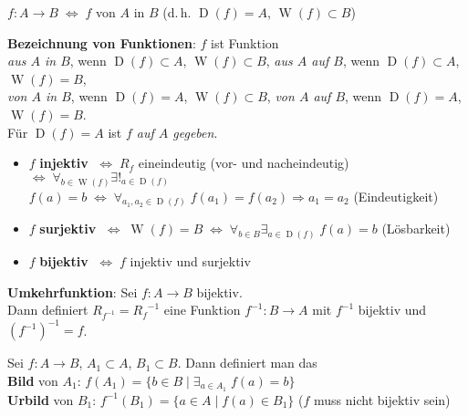 $f: A \rightarrow B \;\Leftrightarrow\; f$ von $A$ in $B$
(d.\,h. $\operatorname{D}(f) = A$, $\operatorname{W}(f) \subset B$)

\textbf{Bezeichnung von Funktionen}: $f$ ist Funktion \\
\emph{aus $A$ in $B$}, wenn
$\operatorname{D}(f) \subset A$, $\operatorname{W}(f) \subset B$, \qquad
\emph{aus $A$ auf $B$}, wenn
$\operatorname{D}(f) \subset A$, $\operatorname{W}(f) = B$, \\
\emph{von $A$ in $B$}, wenn
$\operatorname{D}(f) = A$, $\operatorname{W}(f) \subset B$, \qquad
\emph{von $A$ auf $B$}, wenn
$\operatorname{D}(f) = A$, $\operatorname{W}(f) = B$. \\
Für $\operatorname{D}(f) = A$ ist \emph{$f$ auf $A$ gegeben}.

\linie

\begin{itemize}
    \item $f$ \textbf{injektiv}
    $\;\Leftrightarrow\; R_f$ eineindeutig (vor- und nacheindeutig) \\
    $\Leftrightarrow\; \forall_{b \in \operatorname{W}(f)}
    \exists!_{a \in \operatorname{D}(f)} $
    $f(a) = b \;\Leftrightarrow\; \forall_{a_1, a_2 \in \operatorname{D}(f)}\;
    f(a_1) = f(a_2) \Rightarrow a_1 = a_2$ (Eindeutigkeit)
    
    \item $f$ \textbf{surjektiv}
    $\;\Leftrightarrow\; \operatorname{W}(f) = B \;\Leftrightarrow\;
    \forall_{b \in B} \exists_{a \in \operatorname{D}(f)}\; f(a) = b$
    (Lösbarkeit)
    
    \item $f$ \textbf{bijektiv} $\;\Leftrightarrow\; f$ injektiv und surjektiv
\end{itemize}

\textbf{Umkehrfunktion}: Sei $f: A \rightarrow B$ bijektiv. \\
Dann definiert
$R_{f^{-1}} = {R_f}^{-1}$ eine Funktion $f^{-1}: B \rightarrow A$ mit
$f^{-1}$ bijektiv und $(f^{-1})^{-1} = f$.

\linie

Sei $f: A \rightarrow B$, $A_1 \subset A$, $B_1 \subset B$. Dann definiert man
das \\
\textbf{Bild} von $A_1$:
$f(A_1) = \{b \in B \;|\; \exists_{a \in A_1}\; f(a) = b\}$ \\
\textbf{Urbild} von $B_1$:
$f^{-1}(B_1) = \{a \in A \;|\; f(a) \in B_1\}$
($f$ muss nicht bijektiv sein)

